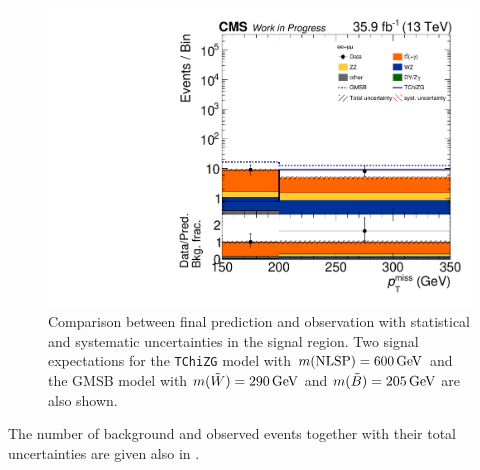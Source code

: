 \begin{figure}[tbp]
 \centering
 \includegraphics[width=\pairwidth]{figures/UnblindingPlots/final_MC_log}
 \caption{Comparison between final prediction and observation with statistical and systematic uncertainties in the signal region. Two signal expectations for the \texttt{TChiZG} model with $m(\text{NLSP})=600\,\text{Ge\hspace{-.08em}V}$ and the GMSB model with $m(\tilde{W})=290\,\text{Ge\hspace{-.08em}V}$ and $m(\tilde{B})=205\,\text{Ge\hspace{-.08em}V}$ are also shown.}
 \label{fig:result}
\end{figure}
The number of background and observed events together with their total uncertainties are given also in .
